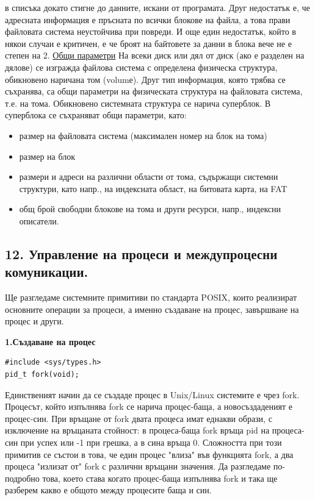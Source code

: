 \documentclass{article}
\begin{document}
в списъка докато стигне до данните, искани от програмата. Друг недостатък е, че адресната информация е пръсната по всички блокове на файла, а това прави
файловата система неустойчива при повреди. И още един недостатък, който в някои случаи е критичен, е че броят на байтовете за данни в блока вече не е степен на 2. \newline\newline
\underline{Общи параметри} \newline\newline
На всеки диск или дял от диск (ако е разделен на дялове) се изгражда файлова система с определена физическа структура, обикновено наричана том (volumе).
Друг тип информация, която трябва се съхранява, са общи параметри на физическата структура на файловата система, т.е. на тома. Обикновено системната структура
се нарича суперблок. В суперблока се съхраняват общи параметри, като:
\begin{itemize}
    \item размер на файловата система (максимален номер на блок на тома)
    \item размер на блок
    \item размери и адреси на различни области от тома, съдържащи системни структури, като напр., на индексната област, на битовата карта, на FAT
    \item общ брой свободни блокове на тома и други ресурси, напр., индексни описатели.
\end{itemize}

\subsection*{\color{bordeaux}12. Управление на процеси и междупроцесни комуникации.}

Ще разгледаме системните примитиви по стандарта POSIX, които реализират основните операции за процеси, а именно създаване на
процес, завършване на процес и други.

\textbf{1.Създаване на процес}
\begin{lstlisting}[style=CStyle]
#include <sys/types.h>
pid_t fork(void);
\end{lstlisting}

Единственият начин да се създаде процес в Unix/Linux системите е чрез fork. Процесът, който изпълнява fork се нарича процес-баща,
а новосъздаденият е процес-син. При връщане от fork двата процеса имат еднакви образи, с изключение на връщаната стойност: в
процеса-баща fork връща pid на процеса-син при успех или -1 при грешка, а в сина връща 0. Сложността при този примитив се състои
в това, че един процес "влиза" във функцията fork, а два процеса "излизат от" fork с различни връщани значения. Да разгледаме
по-подробно това, което става когато процес-баща изпълнява fork и така ще разберем какво е общото между процесите баща и син.
\end{document}
